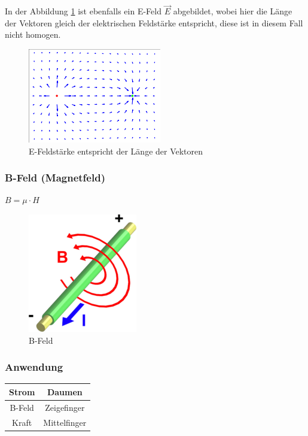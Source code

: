 \documentclass[a4paper, 10pt]{scrartcl}
\begin{document}
In der Abbildung \ref{fig:E-Feldstaerke} ist ebenfalls ein E-Feld $ \vec{E} $ abgebildet, wobei hier die Länge der Vektoren gleich der elektrischen Feldstärke entspricht, diese ist in diesem Fall nicht homogen.

\begin{figure}[h!]
	\begin{center}
		\includegraphics[scale=0.5]{images/E-Feldstaerke.png}
		\caption{E-Feldstärke entspricht der Länge der Vektoren}
		\label{fig:E-Feldstaerke}
	\end{center}
\end{figure}



\subsubsection{B-Feld (Magnetfeld)}
$B = \mu \cdot H$\\
\begin{figure}[h!]
	\begin{center}
		\includegraphics[scale=0.5]{images/B-Feld.png}
		\caption{B-Feld}
		\label{fig:B-Feld}
	\end{center}
\end{figure}

\subsubsection{Anwendung}

\begin{center}
	\begin{tabular}{|c|c|}
		
		\hline Strom & Daumen \\ 
		\hline B-Feld & Zeigefinger \\ 
		\hline Kraft & Mittelfinger \\ 
		\hline 
		
	\end{tabular} 
\end{center}
\end{document}
